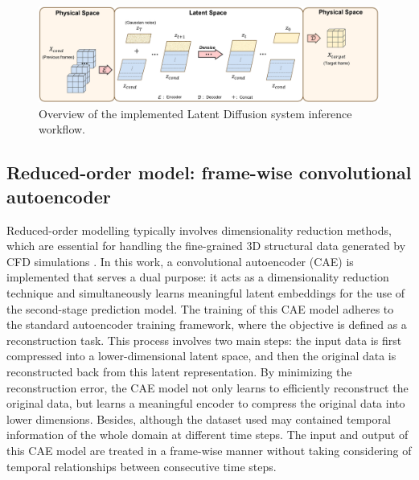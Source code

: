 \documentclass[final-report]{article-template}
\begin{document}
\begin{figure}[htbp]
    \centering
    \includegraphics[width=16cm]{figures/workflow.png}
    \caption{Overview of the implemented Latent Diffusion system inference workflow.}
    \label{fig:workflow}
\end{figure}

\subsection{Reduced-order model: frame-wise convolutional autoencoder}
Reduced-order modelling typically involves dimensionality reduction methods, which are essential for handling the fine-grained 3D structural data generated by CFD simulations \cite{zuo2010fast, masoumi2022review}. In this work, a convolutional autoencoder (CAE) is implemented that serves a dual purpose: it acts as a dimensionality reduction technique and simultaneously learns meaningful latent embeddings for the use of the second-stage prediction model. The training of this CAE model adheres to the standard autoencoder training framework, where the objective is defined as a reconstruction task. This process involves two main steps: the input data is first compressed into a lower-dimensional latent space, and then the original data is reconstructed back from this latent representation. By minimizing the reconstruction error, the CAE model not only learns to efficiently reconstruct the original data, but learns a meaningful encoder to compress the original data into lower dimensions. Besides, although the dataset used may contained temporal information of the whole domain at different time steps. The input and output of this CAE model are treated in a frame-wise manner without taking considering of temporal relationships between consecutive time steps. \\ 
\end{document}
